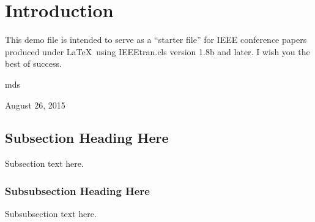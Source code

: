 \documentclass[conference]{../sty/IEEEtran}
\begin{document}
\maketitle

\begin{abstract}
The abstract goes here.
\end{abstract}





%
\IEEEpeerreviewmaketitle



\section{Introduction}
This demo file is intended to serve as a ``starter file''
for IEEE conference papers produced under \LaTeX\ using
IEEEtran.cls version 1.8b and later.
I wish you the best of success.

\hfill mds
 
\hfill August 26, 2015

\subsection{Subsection Heading Here}
Subsection text here.


\subsubsection{Subsubsection Heading Here}
Subsubsection text here.
\end{document}
